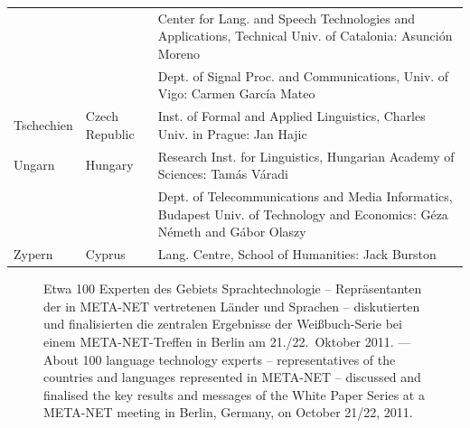\documentclass[]{../../metanetpaper}
\begin{document}
\begin{longtable}{llp{105mm}}
  & & Center for Lang. and Speech Technologies and Applications, Technical Univ. of Catalonia: Asunción Moreno \\ \addlinespace 
  & & Dept. of Signal Proc. and Communications, Univ. of Vigo: Carmen García Mateo \\ \addlinespace 
  Tschechien & \textcolor{grey1}{Czech Republic} & Inst. of Formal and Applied Linguistics, Charles Univ. in Prague: Jan Hajic \\ \addlinespace
  Ungarn & \textcolor{grey1}{Hungary} & Research Inst. for Linguistics, Hungarian Academy of Sciences: Tamás Váradi\\  \addlinespace
  & & Dept. of Telecommunications and Media Informatics, Budapest Univ. of Technology and Economics: Géza Németh and Gábor Olaszy\\ \addlinespace
  Zypern & \textcolor{grey1}{Cyprus} & Lang. Centre, School of Humanities: Jack Burston
\end{longtable}
\normalsize

\renewcommand*{\figureformat}{}
\renewcommand*{\captionformat}{}

\begin{figure}[htbp]
  \center
  \caption{Etwa 100 Experten des Gebiets Sprachtechnologie -- Repräsentanten der in META-NET vertretenen Länder und Sprachen -- diskutierten und finalisierten die zentralen Ergebnisse der Weißbuch-Serie bei einem META-NET-Treffen in Berlin am 21./22.~Oktober 2011. --- \textcolor{grey1}{About 100 language technology experts -- representatives of the countries and languages represented in META-NET -- discussed and finalised the key results and messages of the White Paper Series at a META-NET meeting in Berlin, Germany, on October 21/22, 2011.}}
\end{figure}

\cleardoublepage

\label{whitepaperseries}
\end{document}

